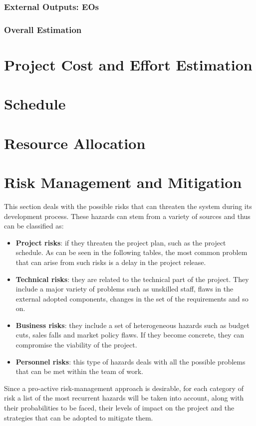 \documentclass[11pt,a4paper]{report}
\begin{document}
\subsection{External Outputs: EOs}
\subsection{Overall Estimation}
\chapter{Project Cost and Effort Estimation}
\chapter{Schedule}
\chapter{Resource Allocation}
\chapter{Risk Management and Mitigation}
This section deals with the possible risks that can threaten the system during its development process. These hazards can stem from a variety of sources and thus can be classified as:
\begin{itemize}
	\item \textbf{Project risks}: if they threaten the project plan, such as the project schedule. As can be seen in the following tables, the most common problem that can arise from such risks is a delay in the project release.
	\item \textbf{Technical risks}: they are related to the technical part of the project. They include a major variety of problems such as unskilled staff, flaws in the external adopted components, changes in the set of the requirements and so on.
	\item \textbf{Business risks}: they include a set of heterogeneous hazards such as budget cuts, sales falls and market policy flaws. If they become concrete, they can compromise the viability of the project.
	\item \textbf{Personnel risks}: this type of hazards deals with all the possible problems that can be met within the team of work.
\end{itemize}
Since a pro-active risk-management approach is desirable, for each category of risk a list of the most recurrent hazards will be taken into account, along with their probabilities to be faced, their levels of impact on the project and the strategies that can be adopted to mitigate them.
\end{document}
